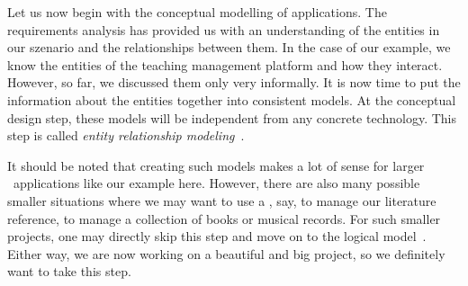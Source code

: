 %
\label{sec:conceptualSchemaDesign}%
%
Let us now begin with the conceptual modelling of applications.
The requirements analysis has provided us with an understanding of the entities in our szenario and the relationships between them.
In the case of our example, we know the entities of the teaching management platform and how they interact.
However, so far, we discussed them only very informally.
It is now time to put the information about the entities together into consistent models.
At the conceptual design step, these models will be independent from any concrete technology.
This step is called \emph{entity relationship modeling}~\cite{G2011EW2ITDS:CMUTERM,SS2005EIDDDFDB:CDDRAAML,SS2005EIDDDFDB:CDDICAMP,V1999C5DMS:CDUTERM,B1990CMERMO}.

It should be noted that creating such models makes a lot of sense for larger \db\ applications like our example here.
However, there are also many possible smaller situations where we may want to use a \db, say, to manage our literature reference, to manage a collection of books or musical records.
For such smaller projects, one may directly skip this step and move on to the logical model~\cite{S2024D:CDMERDE}.
Either way, we are now working on a beautiful and big project, so we definitely want to take this step.
%
%
%
%
%
%
%
%
%
%
\endhsection%
%
